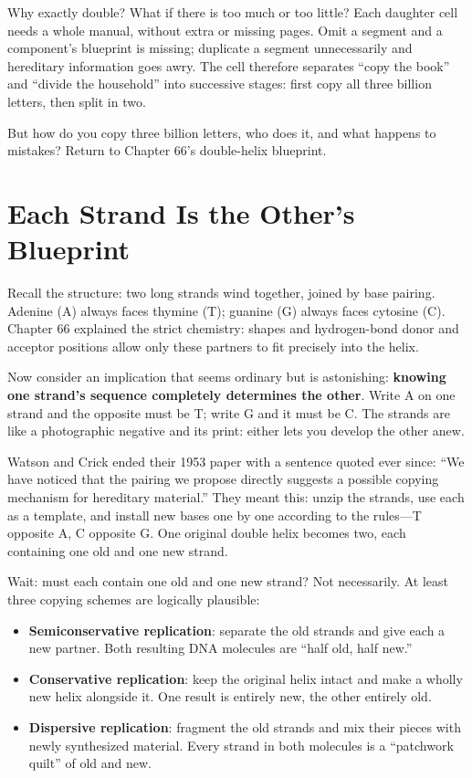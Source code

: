 Why exactly double? What if there is too much or too little? Each daughter cell needs a whole manual, without extra or missing pages. Omit a segment and a component's blueprint is missing; duplicate a segment unnecessarily and hereditary information goes awry. The cell therefore separates ``copy the book'' and ``divide the household'' into successive stages: first copy all three billion letters, then split in two.

But how do you copy three billion letters, who does it, and what happens to mistakes? Return to Chapter 66's double-helix blueprint.

\section{Each Strand Is the Other's Blueprint}

Recall the structure: two long strands wind together, joined by base pairing. Adenine (A) always faces thymine (T); guanine (G) always faces cytosine (C). Chapter 66 explained the strict chemistry: shapes and hydrogen-bond donor and acceptor positions allow only these partners to fit precisely into the helix.

Now consider an implication that seems ordinary but is astonishing: \textbf{knowing one strand's sequence completely determines the other}. Write A on one strand and the opposite must be T; write G and it must be C. The strands are like a photographic negative and its print: either lets you develop the other anew.

Watson and Crick ended their 1953 paper with a sentence quoted ever since: ``We have noticed that the pairing we propose directly suggests a possible copying mechanism for hereditary material.'' They meant this: unzip the strands, use each as a template, and install new bases one by one according to the rules---T opposite A, C opposite G. One original double helix becomes two, each containing one old and one new strand.

Wait: must each contain one old and one new strand? Not necessarily. At least three copying schemes are logically plausible:

\begin{itemize}[itemsep=2pt]
\item \textbf{Semiconservative replication}: separate the old strands and give each a new partner. Both resulting DNA molecules are ``half old, half new.''
\item \textbf{Conservative replication}: keep the original helix intact and make a wholly new helix alongside it. One result is entirely new, the other entirely old.
\item \textbf{Dispersive replication}: fragment the old strands and mix their pieces with newly synthesized material. Every strand in both molecules is a ``patchwork quilt'' of old and new.
\end{itemize}


